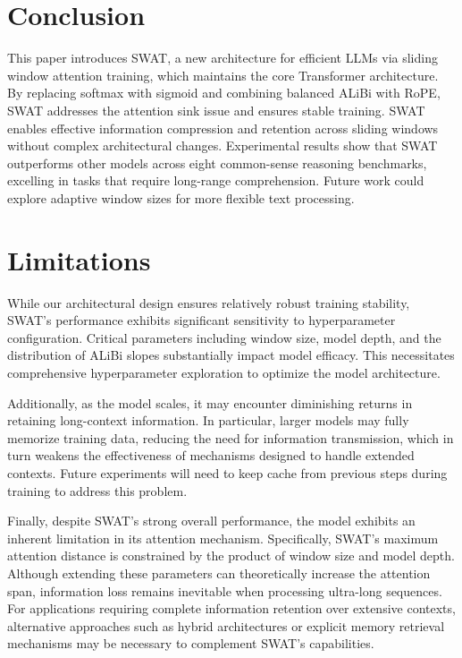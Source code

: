 \section{Conclusion}
\label{sec:conclusion}

This paper introduces SWAT, a new architecture for efficient LLMs via sliding window attention training, which maintains the core Transformer architecture. By replacing softmax with sigmoid and combining balanced ALiBi with RoPE, SWAT addresses the attention sink issue and ensures stable training. SWAT enables effective information compression and retention across sliding windows without complex architectural changes. Experimental results show that SWAT outperforms other models across eight common-sense reasoning benchmarks, excelling in tasks that require long-range comprehension. Future work could explore adaptive window sizes for more flexible text processing.


\section{Limitations}

While our architectural design ensures relatively robust training stability, SWAT's performance exhibits significant sensitivity to hyperparameter configuration. Critical parameters including window size, model depth, and the distribution of ALiBi slopes substantially impact model efficacy. This necessitates comprehensive hyperparameter exploration to optimize the model architecture.

Additionally, as the model scales, it may encounter diminishing returns in retaining long-context information. In particular, larger models may fully memorize training data, reducing the need for information transmission, which in turn weakens the effectiveness of mechanisms designed to handle extended contexts. Future experiments will need to keep cache from previous steps during training to address this problem.

Finally, despite SWAT's strong overall performance, the model exhibits an inherent limitation in its attention mechanism. Specifically, SWAT's maximum attention distance is constrained by the product of window size and model depth. Although extending these parameters can theoretically increase the attention span, information loss remains inevitable when processing ultra-long sequences. For applications requiring complete information retention over extensive contexts, alternative approaches such as hybrid architectures or explicit memory retrieval mechanisms may be necessary to complement SWAT's capabilities.







